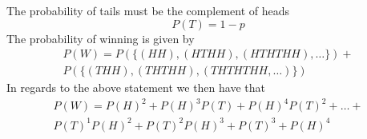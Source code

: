 The probability of tails must be the complement of heads
\[
    P(T)=1-p
\]
The probability of winning is given by
\begin{equation*}
  \begin{gathered}
    P(W)=P(\{(HH),(HTHH),(HTHTHH),\ldots\})+ \\
    P(\{(THH),(THTHH),(THTHTHH,\ldots)\})
  \end{gathered}
\end{equation*}
In regards to the above statement we then have that
\begin{equation*}
  \begin{gathered}
    P(W)=P(H)^{2}+P(H)^{3}P(T)+P(H)^{4}P(T)^{2}+\ldots+ \\
    P(T)^{1}P(H)^{2}+P(T)^{2}P(H)^{3}+P(T)^{3}+P(H)^{4}
  \end{gathered}
\end{equation*}

